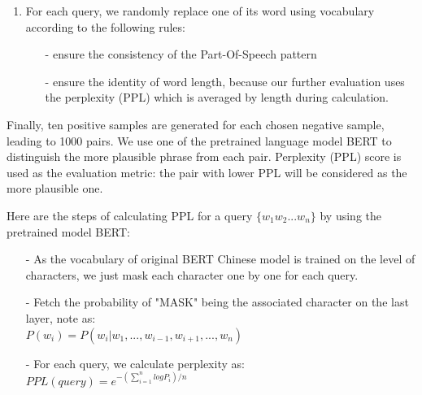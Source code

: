 \begin{enumerate}
	\item For each query, we randomly replace one of its word using vocabulary according to the following rules:
	\begin{itemize}
		\item [-] 
		ensure the consistency of the Part-Of-Speech pattern
		\item [-] %
		ensure the identity of word length, because our further evaluation uses the perplexity (PPL) which is averaged by length during calculation. 
	\end{itemize} 
\end{enumerate}

Finally, ten positive samples are generated for each chosen negative sample, leading to 1000 pairs. We use one of the pretrained language model BERT to distinguish the more plausible phrase from each pair. Perplexity (PPL) score is used as the evaluation metric: the pair with lower PPL will be considered as the more plausible one.

Here are the steps of calculating PPL for a query $\{w_1 w_2 ... w_n\}$ by using the pretrained model BERT:
\begin{itemize}
	\item [-] As the vocabulary of original BERT Chinese model is trained on the level of characters, we just mask each character one by one for each query.
	\item [-] Fetch the probability of "MASK" being the associated character on the last layer, note as:\\$P(w_i) = P(w_i|w_1,...,w_{i-1},w_{i+1},...,w_n)$
	\item [-] For each query, we calculate perplexity as: \\
	$PPL(query) = e^{-(\sum_{i=1}^{n}logP_{i})/n}$  
\end{itemize}

